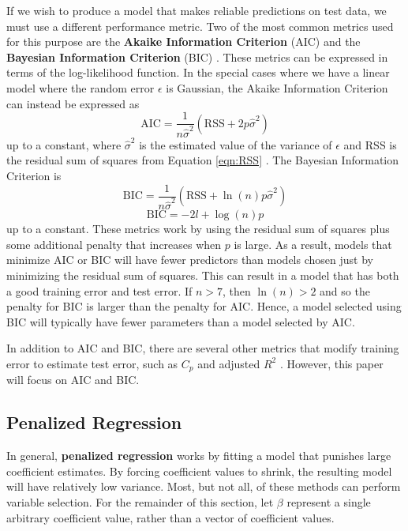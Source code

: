 \documentclass{article}
\newcommand{\RSS}{\text{RSS}}
\begin{document}
If we wish to produce a model that makes reliable predictions on test data, we must use a different performance metric. Two of the most common metrics used for this purpose are the \textbf{Akaike Information Criterion} (AIC) and the \textbf{Bayesian Information Criterion} (BIC) \cite{akaike1998information, schwarz1978estimating}. These metrics can be expressed in terms of the log-likelihood function. In the special cases where we have a linear model where the random error $\epsilon$ is Gaussian, the Akaike Information Criterion can instead be expressed as
\begin{equation}
	\text{AIC} = \frac{1}{n\hat{\sigma}^2}(\RSS + 2p\hat{\sigma}^2)
\end{equation}
up to a constant, where $\hat{\sigma}^2$ is the estimated value of the variance of $\epsilon$ and RSS is the residual sum of squares from Equation \ref{eqn:RSS} \cite{james2013introduction}. The Bayesian Information Criterion is
\begin{equation}
	\text{BIC} = \frac{1}{n\hat{\sigma}^2}(\RSS + \ln(n)p\hat{\sigma}^2)
\end{equation}
\begin{equation}
	\text{BIC} = -2l + \log(n)p
\end{equation}
up to a constant. These metrics work by using the residual sum of squares plus some additional penalty that increases when $p$ is large. As a result, models that minimize AIC or BIC will have fewer predictors than models chosen just by minimizing the residual sum of squares. This can result in a model that has both a good training error and test error. If $n>7$, then $\ln(n)>2$ and so the penalty for BIC is larger than the penalty for AIC. Hence, a model selected using BIC will typically have fewer parameters than a model selected by AIC.

In addition to AIC and BIC, there are several other metrics that modify training error to estimate test error, such as $C_p$ and adjusted $R^2$ \cite{james2013introduction}. However, this paper will focus on AIC and BIC.
\subsection{Penalized Regression}

In general, \textbf{penalized regression} works by fitting a model that punishes large coefficient estimates. By forcing coefficient values to shrink, the resulting model will have relatively low variance. Most, but not all, of these methods can perform variable selection. For the remainder of this section, let $\beta$ represent a single arbitrary coefficient value, rather than a vector of coefficient values.
\end{document}
